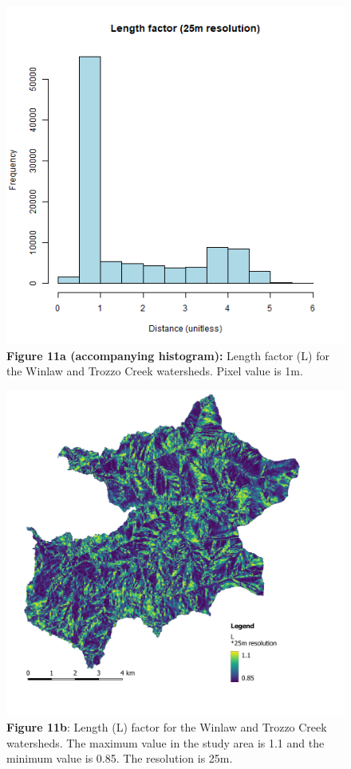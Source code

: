 \documentclass[
]{article}
\begin{document}
\begin{figure}
\centering
\includegraphics{img/L_1m_hist.png}
\caption{\textbf{Figure 11a (accompanying histogram):} Length factor (L) for the Winlaw and Trozzo Creek watersheds. Pixel value is 1m.}
\end{figure}

\begin{figure}
\centering
\includegraphics{img/l_25m.png}
\caption{\textbf{Figure 11b}: Length (L) factor for the Winlaw and Trozzo Creek watersheds. The maximum value in the study area is 1.1 and the minimum value is 0.85. The resolution is 25m.}
\end{figure}
\end{document}
